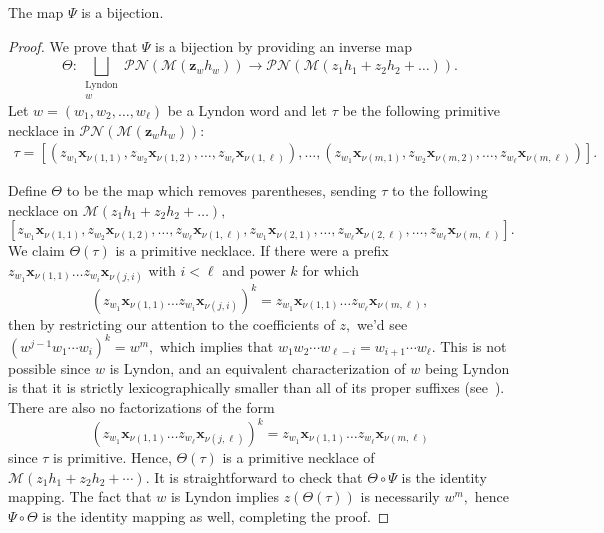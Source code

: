 \documentclass[ALCO, Unicode]{cedram}
\begin{document}
\begin{prop}\label{prop:eval-preserve-bij}
    The map $\Psi$ is a bijection.
\end{prop}
\begin{proof}
We prove that $\Psi$ is a bijection by providing an inverse map \[\Theta:  \bigsqcup_{\substack{\text{Lyndon}\\ w}}\mathscr{PN}\left(\mathcal{M}\left(\mathbf{z}_wh_w\right)\right)\longrightarrow \mathscr{PN}\left(\mathcal{M}\left(z_1 h_1 + z_2h_2 + \ldots\right)\right).\]
 Let $w = (w_1, w_2, \ldots, w_\ell)$ be a Lyndon word and let $\tau$ be the following primitive necklace in $\mathscr{PN}(\mathcal{M}(\mathbf{z}_w h_w)):$ 
{\small \begin{align*}
\tau =\left[{\left(z_{w_1}\mathbf{x}_{\nu(1,1)},z_{w_2}\mathbf{x}_{\nu(1,2)}, \ldots, z_{w_\ell}\mathbf{x}_{\nu(1,\ell)} \right)},\ldots,{\left(z_{w_{1}}\mathbf{x}_{\nu(m,1)},z_{w_{2}}\mathbf{x}_{\nu(m,2)}, \ldots, z_{w_{\ell}}\mathbf{x}_{\nu(m,\ell)} \right)} \right].
\end{align*}}

 Define $\Theta$ to be the map which removes parentheses, sending $\tau$ to the following necklace on $\mathcal{M}(z_1h_1 + z_2h_2 + \ldots),$
\[\left[z_{w_1}\mathbf{x}_{\nu(1, 1)}, z_{w_2}\mathbf{x}_{\nu(1, 2)}, \ldots, z_{w_\ell}\mathbf{x}_{\nu(1, \ell)}, z_{w_1}\mathbf{x}_{\nu(2,1)}, \ldots, z_{w_\ell }\mathbf{x}_{\nu(2,\ell)}, \ldots,  z_{w_\ell}\mathbf{x}_{\nu(m, \ell)}\right].\] We claim $\Theta(\tau)$ is a primitive necklace. If there were a prefix $z_{w_1}\mathbf{x}_{\nu(1, 1)} \ldots z_{w_i}\mathbf{x}_{\nu(j, i)}$ with $i < \ell$ and power $k$ for which \[\left(z_{w_1}\mathbf{x}_{\nu(1, 1)} \ldots z_{w_i}\mathbf{x}_{\nu(j, i)}\right)^k = z_{w_1}\mathbf{x}_{\nu(1, 1)}\ldots z_{w_\ell}\mathbf{x}_{\nu(m, \ell)},\] then by restricting our attention to the coefficients of $z,$ we'd see $(w^{j - 1}w_1\cdots w_i)^k = w^{m},$ which implies that $w_1w_2 \cdots w_{\ell - i} = w_{i + 1}\cdots w_\ell .$ This is not possible since $w$ is Lyndon, and an equivalent characterization of $w$ being Lyndon is that it is strictly lexicographically smaller than all of its proper suffixes (see~\cite[Proposition 5.12]{Lothaire_1997}). There are also no factorizations of the form
\[\left(z_{w_1}\mathbf{x}_{\nu(1, 1)} \ldots z_{w_\ell}\mathbf{x}_{\nu(j, \ell)}\right)^k = z_{w_1}\mathbf{x}_{\nu(1, 1)}\ldots z_{w_\ell}\mathbf{x}_{\nu(m, \ell)}\] since $\tau$ is primitive. Hence, $\Theta(\tau)$ is a {primitive} necklace of $\mathcal{M}(z_1h_1 + z_2h_2 + \cdots).$ It is straightforward to check that $\Theta \circ \Psi$ is the identity mapping. The fact that $w$ is Lyndon implies $z \left(\Theta(\tau)\right)$ is necessarily $w^m,$ hence  $ \Psi \circ \Theta$ is the identity mapping as well, completing the proof.
\end{proof}
\end{document}
